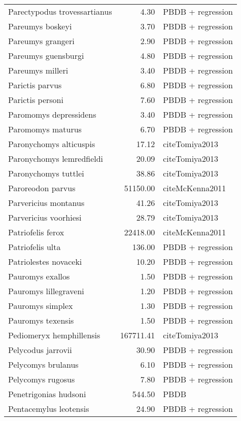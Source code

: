 \begin{table}[ht]
\begin{tabular}{lrl}
  Parectypodus trovessartianus & 4.30 & PBDB + regression \\ 
  Pareumys boskeyi & 3.70 & PBDB + regression \\ 
  Pareumys grangeri & 2.90 & PBDB + regression \\ 
  Pareumys guensburgi & 4.80 & PBDB + regression \\ 
  Pareumys milleri & 3.40 & PBDB + regression \\ 
  Parictis parvus & 6.80 & PBDB + regression \\ 
  Parictis personi & 7.60 & PBDB + regression \\ 
  Paromomys depressidens & 3.40 & PBDB + regression \\ 
  Paromomys maturus & 6.70 & PBDB + regression \\ 
  Paronychomys alticuspis & 17.12 & cite{Tomiya2013} \\ 
  Paronychomys lemredfieldi & 20.09 & cite{Tomiya2013} \\ 
  Paronychomys tuttlei & 38.86 & cite{Tomiya2013} \\ 
  Paroreodon parvus & 51150.00 & cite{McKenna2011} \\ 
  Parvericius montanus & 41.26 & cite{Tomiya2013} \\ 
  Parvericius voorhiesi & 28.79 & cite{Tomiya2013} \\ 
  Patriofelis ferox & 22418.00 & cite{McKenna2011} \\ 
  Patriofelis ulta & 136.00 & PBDB + regression \\ 
  Patriolestes novaceki & 10.20 & PBDB + regression \\ 
  Pauromys exallos & 1.50 & PBDB + regression \\ 
  Pauromys lillegraveni & 1.20 & PBDB + regression \\ 
  Pauromys simplex & 1.30 & PBDB + regression \\ 
  Pauromys texensis & 1.50 & PBDB + regression \\ 
  Pediomeryx hemphillensis & 167711.41 & cite{Tomiya2013} \\ 
  Pelycodus jarrovii & 30.90 & PBDB + regression \\ 
  Pelycomys brulanus & 6.10 & PBDB + regression \\ 
  Pelycomys rugosus & 7.80 & PBDB + regression \\ 
  Penetrigonias hudsoni & 544.50 & PBDB \\ 
  Pentacemylus leotensis & 24.90 & PBDB + regression \\ 

\end{tabular}
\end{table}
